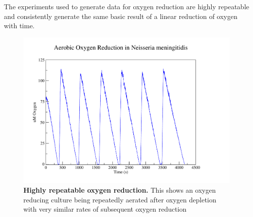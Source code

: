 The experiments used to generate data for oxygen reduction are highly repeatable and consistently generate the same basic result of a linear reduction of oxygen with time.
\begin{figure}[p]
 \centering
 \includegraphics[width=14cm, trim=75px 50px 125px 25px]{./05-oxygenreduction/data/repeatable_o2.pdf}
 \caption[Highly repeatable oxygen reduction]{{\bf Highly repeatable oxygen reduction.} This shows an oxygen reducing culture being repeatedly aerated after oxygen depletion with very similar rates of subsequent oxygen reduction
 \label{fig:oxy_repeatable_chl}}
\end{figure}
\afterpage{\clearpage}

